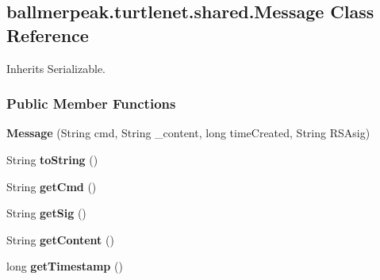 \hypertarget{classballmerpeak_1_1turtlenet_1_1shared_1_1Message}{\subsection{ballmerpeak.\-turtlenet.\-shared.\-Message Class Reference}
\label{classballmerpeak_1_1turtlenet_1_1shared_1_1Message}
}


Inherits Serializable.

\subsubsection*{Public Member Functions}
\begin{DoxyCompactItemize}
\item 
\hypertarget{classballmerpeak_1_1turtlenet_1_1shared_1_1Message_a041662ab689ade1ea19f62e5cd817ca9}{{\bfseries Message} (String cmd, String \-\_\-content, long time\-Created, String R\-S\-Asig)}\label{classballmerpeak_1_1turtlenet_1_1shared_1_1Message_a041662ab689ade1ea19f62e5cd817ca9}

\item 
\hypertarget{classballmerpeak_1_1turtlenet_1_1shared_1_1Message_aa8740ff71efab8c679bbe843ddb2ece6}{String {\bfseries to\-String} ()}\label{classballmerpeak_1_1turtlenet_1_1shared_1_1Message_aa8740ff71efab8c679bbe843ddb2ece6}

\item 
\hypertarget{classballmerpeak_1_1turtlenet_1_1shared_1_1Message_ab325933a58271b3dfb2248fb0aa5f04a}{String {\bfseries get\-Cmd} ()}\label{classballmerpeak_1_1turtlenet_1_1shared_1_1Message_ab325933a58271b3dfb2248fb0aa5f04a}

\item 
\hypertarget{classballmerpeak_1_1turtlenet_1_1shared_1_1Message_ae53793a87f824fad0a57bdf3ca99b8b2}{String {\bfseries get\-Sig} ()}\label{classballmerpeak_1_1turtlenet_1_1shared_1_1Message_ae53793a87f824fad0a57bdf3ca99b8b2}

\item 
\hypertarget{classballmerpeak_1_1turtlenet_1_1shared_1_1Message_af04d03a5ccc6fbf47401869f70202076}{String {\bfseries get\-Content} ()}\label{classballmerpeak_1_1turtlenet_1_1shared_1_1Message_af04d03a5ccc6fbf47401869f70202076}

\item 
\hypertarget{classballmerpeak_1_1turtlenet_1_1shared_1_1Message_a9f05d89ed28e6aff33af41879f867389}{long {\bfseries get\-Timestamp} ()}\label{classballmerpeak_1_1turtlenet_1_1shared_1_1Message_a9f05d89ed28e6aff33af41879f867389}


\end{DoxyCompactItemize}
